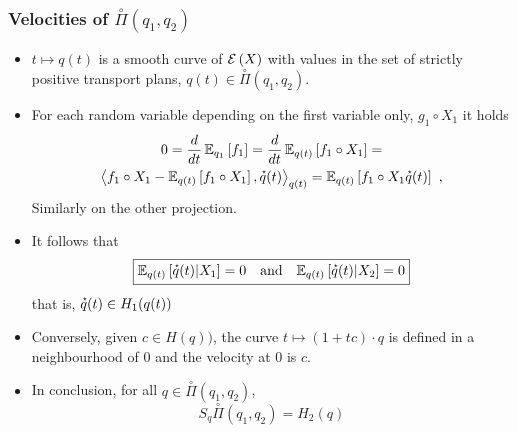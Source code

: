 \documentclass[xcolor=svgnames]{beamer}
\newcommand{\condexpectat}[3]{{\Expectation}_{#1}\left[#2 \middle| #3\right]}
\begin{document}
\begin{frame}\small\frametitle{Velocities of $\overset{\circ}\Pi(q_1,q_2)$}

\begin{itemize}
    \item $t \mapsto q(t)$ is a smooth curve of $\maxexpat X$ with values in the set of strictly positive transport plans, $q(t) \in \overset{\circ}{\Pi}(q_1,q_2)$.
    \item For each random variable depending on the first variable only, $g_1\circ X_1$ it holds
\begin{multline*} 0 = \derivby t \expectat {q_1} {f_1} =  \derivby t \expectat {q(t)} {f_1\circ X_1} = \\ \scalarat {q(t)}  {f_1 \circ X_1 - \expectat {q(t)} {f_1\circ X_1}} {\velocity q(t)} = \expectat {q(t)} {f_1\circ X_1 \velocity q(t)} \ , \end{multline*}  Similarly on the other projection.
\item It follows that
\begin{equation*}
\boxed{\condexpectat {q(t)} {\velocity q(t)} {X_1} = 0 \quad \text{and} \quad \condexpectat {q(t)} {\velocity q(t)} {X_2} = 0}
\end{equation*}
that is, $\velocity q(t) \in H_1(q(t))$
\item Conversely, given $c \in H(q))$, the curve $t \mapsto (1+tc) \cdot q$ is defined in a neighbourhood of 0 and the velocity at 0 is $c$.
\item In conclusion, for all $q \in \overset{\circ}{\Pi}(q_1,q_2)$,
\begin{equation*}
 \boxed{S_q \overset{\circ}\Pi(q_1,q_2) = H_2(q)}
\end{equation*}
\end{itemize}
\end{frame}
\end{document}
